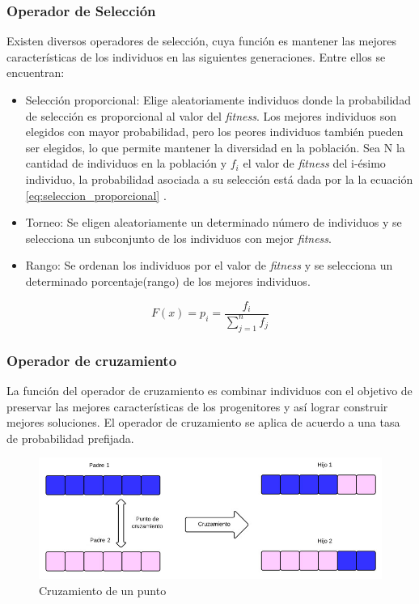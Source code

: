 \subsubsection{Operador de Selección}
Existen diversos operadores de selección, cuya función es mantener las mejores características de los individuos en las siguientes generaciones. Entre ellos se encuentran:
\begin{itemize}
	\item Selección proporcional: Elige aleatoriamente individuos donde la probabilidad de selección es proporcional al valor del \emph{fitness}. Los mejores individuos son elegidos con mayor probabilidad, pero los peores individuos también pueden ser elegidos, lo que permite mantener la diversidad en la población. Sea N la cantidad de individuos en la población y $f_i$ el valor de \emph{fitness} del i-ésimo individuo, la probabilidad asociada a su selección está dada por la la ecuación \ref{eq:seleccion_proporcional} .
	\item Torneo: Se eligen aleatoriamente un determinado número de individuos y se selecciona un subconjunto de los individuos con mejor \emph{fitness}.
	\item Rango: Se ordenan los individuos por el valor de \emph{fitness} y se selecciona un determinado porcentaje(rango) de los mejores individuos.
\end{itemize}

\begin{equation}
\label{eq:seleccion_proporcional}
F(x) =  p_i = \frac{f_i}{\sum_{j=1}^{n}{f_j}}  
\end{equation}
        
        
\subsubsection{Operador de cruzamiento}
La función del operador de cruzamiento es combinar individuos con el objetivo de preservar las mejores características de los progenitores y así lograr construir mejores soluciones. El operador de cruzamiento se aplica de acuerdo a una tasa de probabilidad prefijada. 

\begin{figure}[ht]
	\centering
	\includegraphics[width=\textwidth]{Figures/cruzamiento1}
	\caption{Cruzamiento de un punto}
	\label{fig:cruzamiento1}
\end{figure}

